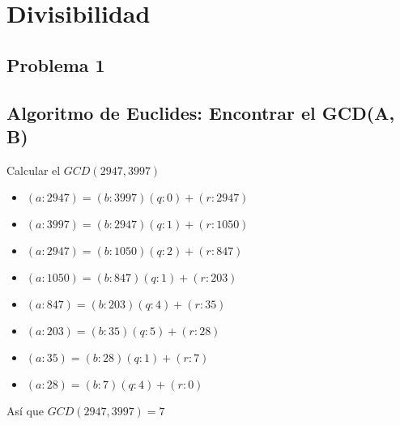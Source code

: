\documentclass[12pt, fleqn]{article}                             %
\begin{document}
\tableofcontents{}
\label{sec:Index}

\clearpage




\section{Divisibilidad}

    \subsection{Problema 1}
    \subsection*{Algoritmo de Euclides: Encontrar el GCD(A, B)}

            Calcular el $GCD(2947, 3997)$
            \begin{itemize}
                \item $(a:2947) = (b:3997)(q:0) + (r:2947)$
                \item $(a:3997) = (b:2947)(q:1) + (r:1050)$
                \item $(a:2947) = (b:1050)(q:2) + (r:847)$
                \item $(a:1050) = (b:847)(q:1) + (r:203)$
                \item $(a:847) = (b:203)(q:4) + (r:35)$
                \item $(a:203) = (b:35)(q:5) + (r:28)$
                \item $(a:35) = (b:28)(q:1) + (r:7)$
                \item $(a:28) = (b:7)(q:4) + (r:0)$
            \end{itemize}                    
            Así que $GCD(2947, 3997) = 7$\\
\end{document}
